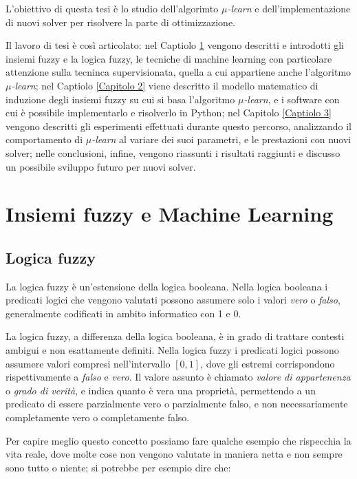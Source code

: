 \documentclass[a4paper,12pt]{report}
\begin{document}
L'obiettivo di questa tesi è lo studio dell'algorimto \textit{$\mu$-learn} e dell'implementazione di nuovi solver per risolvere la parte di ottimizzazione.

Il lavoro di tesi è così articolato: nel Captiolo \ref{Capitolo 1} vengono descritti e introdotti gli insiemi fuzzy e la logica fuzzy, le tecniche di machine learning con particolare attenzione sulla tecninca supervisionata, quella a cui appartiene anche l'algoritmo \textit{$\mu$-learn}; nel Captiolo \ref{Capitolo 2} viene descritto il modello matematico di induzione degli insiemi fuzzy su cui si basa l'algoritmo \textit{$\mu$-learn}, e i software con cui è possibile implementarlo e risolverlo in Python; nel Capitolo \ref{Captiolo 3} vengono descritti gli esperimenti effettuati durante questo percorso, analizzando il comportamento di \textit{$\mu$-learn} al variare dei suoi parametri, e le prestazioni con nuovi solver; nelle conclusioni, infine, vengono riassunti i risultati raggiunti e discusso un possibile sviluppo futuro per nuovi solver.


\chapter{Insiemi fuzzy e Machine Learning}
\label{Capitolo 1}
\section{Logica fuzzy}
La logica fuzzy \cite{logica_fuzzy} è un'estensione della logica booleana.
Nella logica booleana i predicati logici che vengono valutati possono assumere solo i valori \textit{vero} o \textit{falso}, generalmente codificati in ambito informatico con 1 e 0.


La logica fuzzy, a differenza della logica booleana, è in grado di trattare contesti ambigui e non esattamente definiti.
Nella logica fuzzy i predicati logici possono assumere valori compresi nell'intervallo $[0,1]$, dove gli estremi corrispondono rispettivamente a \textit{falso} e \textit{vero}.
Il valore assunto è chiamato \textit{valore di appartenenza} o \textit{grado di verità}, e indica quanto è vera una proprietà, permettendo a un predicato di essere parzialmente vero o parzialmente falso, e non necessariamente completamente vero o completamente falso.

\bigskip

Per capire meglio questo concetto possiamo fare qualche esempio che rispecchia la vita reale, dove molte cose non vengono valutate in maniera netta e non sempre sono tutto o niente; si potrebbe per esempio dire che:
\end{document}
